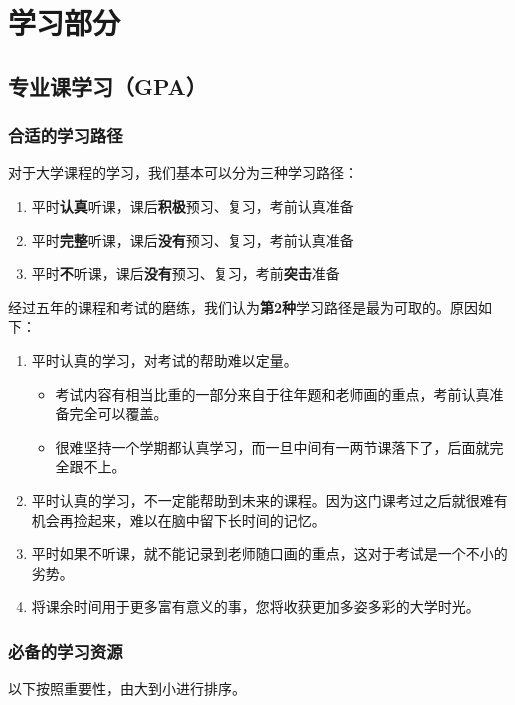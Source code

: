 \documentclass[zihao=-4,fontset=none]{Beautybook-CN}
\begin{document}
\part{学习部分}

\chapter{专业课学习（GPA）}
\section{合适的学习路径}

对于大学课程的学习，我们基本可以分为三种学习路径：
\begin{enumerate}
	\item 平时\textbf{认真}听课，课后\textbf{积极}预习、复习，考前认真准备
	\item 平时\textbf{完整}听课，课后\textbf{没有}预习、复习，考前认真准备
	\item 平时\textbf{不}听课，课后\textbf{没有}预习、复习，考前\textbf{突击}准备
\end{enumerate}

经过五年的课程和考试的磨练，我们认为\textbf{第2种}学习路径是最为可取的。原因如下：
\begin{enumerate}
	\item 平时认真的学习，对考试的帮助难以定量。
	      \begin{itemize}
	      	\item 考试内容有相当比重的一部分来自于往年题和老师画的重点，考前认真准备完全可以覆盖。
	      	\item 很难坚持一个学期都认真学习，而一旦中间有一两节课落下了，后面就完全跟不上。
	      \end{itemize}
	      	      
	\item 平时认真的学习，不一定能帮助到未来的课程。因为这门课考过之后就很难有机会再捡起来，难以在脑中留下长时间的记忆。
	\item 平时如果不听课，就不能记录到老师随口画的重点，这对于考试是一个不小的劣势。
	\item 将课余时间用于更多富有意义的事，您将收获更加多姿多彩的大学时光。
\end{enumerate}
\section{必备的学习资源}

以下按照重要性，由大到小进行排序。
\end{document}
